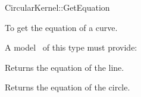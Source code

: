 \begin{ccRefFunctionObjectConcept}{CircularKernel::GetEquation}

\ccDefinition

To get the equation of a curve.


A model \ccVar\ of this type must provide:

{Returns the equation of the line.}

{Returns the equation of the circle.}

\ccHasModels


\end{ccRefFunctionObjectConcept}

